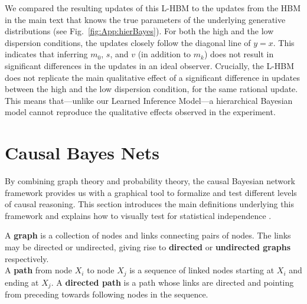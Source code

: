 
We compared the resulting updates of this L-HBM to the updates from the HBM in the main text that knows the true parameters of the underlying generative distributions (see Fig.~\ref{fig:App:hierBayes}). For both the high and the low dispersion conditions, the updates closely follow the diagonal line of $y=x$. This indicates that inferring $m_0$, $s$, and $v$ (in addition to $m_k$) does not result in significant differences in the updates in an ideal observer. Crucially, the L-HBM does not replicate the main qualitative effect of a significant difference in updates between the high and the low dispersion condition, for the same rational update. This means that---unlike our Learned Inference Model---a hierarchical Bayesian model cannot reproduce the qualitative effects observed in the experiment.

\newpage

\section{Causal Bayes Nets}
\label{app:causal_cbn}

By combining graph theory and probability theory, the causal Bayesian network framework provides us with a graphical tool to formalize and test different levels of causal reasoning. This section introduces the main definitions underlying this framework and explains how to visually test for statistical independence  \citep{pearl88probabilistic,bishop06pattern,kollerl09probabilistic,barber12bayesian,murphy12machine}.


A {\bf graph} is a collection of nodes and links connecting pairs of nodes.
The links may be directed or undirected, giving rise to {\bf directed} or {\bf undirected graphs} respectively.\\[5pt]
A {\bf path} from node $X_i$ to node $X_j$ is a sequence of linked nodes starting
at $X_i$ and ending at $X_j$. A {\bf directed path} is a path whose links are directed and pointing from preceding towards following nodes in the sequence.\\[5pt]

